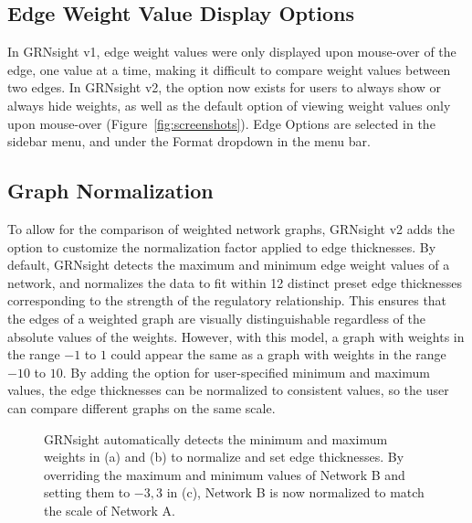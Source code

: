 \documentclass[sigconf,review]{acmart}
\begin{document}
\subsection{Edge Weight Value Display Options}
In GRNsight v1, edge weight values were only displayed upon mouse-over of the edge, one value at a time, making it difficult to compare weight values between two edges. In GRNsight v2, the option now exists for users to always show or always hide weights, as well as the default option of viewing weight values only upon mouse-over (Figure~\ref{fig:screenshots}). Edge Options are selected in the sidebar menu, and under the Format dropdown in the menu bar.

\subsection{Graph Normalization}

To allow for the comparison of weighted network graphs, GRNsight v2 adds the option to customize the normalization factor applied to edge thicknesses. By default, GRNsight detects the maximum and minimum edge weight values of a network, and normalizes the data to fit within 12 distinct preset edge thicknesses corresponding to the strength of the regulatory relationship. This ensures that the edges of a weighted graph are visually distinguishable regardless of the absolute values of the weights. However, with this model, a graph with weights in the range \(-1\) to \(1\) could appear the same as a graph with weights in the range \(-10\) to \(10\). By adding the option for user-specified minimum and maximum values, the edge thicknesses can be normalized to consistent values, so the user can compare different graphs on the same scale.

\begin{figure}[h]
    \centering
    \caption{GRNsight automatically detects the minimum and maximum weights in (a) and (b) to normalize and set edge thicknesses. By overriding the maximum and minimum values of Network B and setting them to \(-3, 3\) in (c), Network B is now normalized to match the scale of Network A.}
    \label{fig:network-screenshots}
\end{figure}
\end{document}
